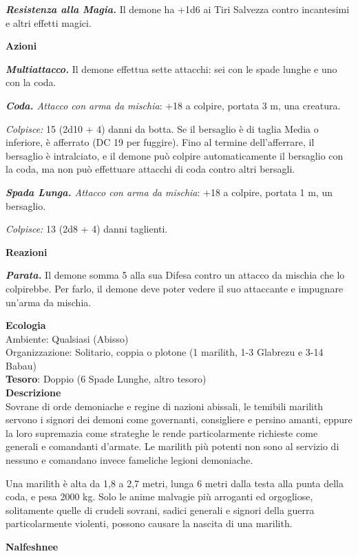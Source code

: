 \begin{multicols}{2}
\textit{\textbf{Resistenza alla Magia.}} Il demone ha +1d6 ai Tiri Salvezza contro incantesimi e altri effetti magici.

\textbf{Azioni}

\textit{\textbf{Multiattacco.}} Il demone effettua sette attacchi: sei con le spade lunghe e uno con la coda.

\textit{\textbf{Coda.} Attacco con arma da mischia}: +18 a colpire, portata 3 m, una creatura.

\textit{Colpisce:} 15 (2d10 + 4) danni da botta. Se il bersaglio è di taglia Media o inferiore, è afferrato (DC 19 per fuggire). Fino al termine dell'afferrare, il bersaglio è intralciato, e il demone può colpire automaticamente il bersaglio con la coda, ma non può effettuare attacchi di coda contro altri bersagli.

\textit{\textbf{Spada Lunga.} Attacco con arma da mischia}: +18 a colpire, portata 1 m, un bersaglio.

\textit{Colpisce:} 13 (2d8 + 4) danni taglienti.

\textbf{Reazioni}

\textit{\textbf{Parata.}} Il demone somma 5 alla sua Difesa contro un attacco da mischia che lo colpirebbe. Per farlo, il demone deve poter vedere il suo attaccante e impugnare un'arma da mischia.

\textbf{Ecologia}\\
Ambiente: Qualsiasi (Abisso)\\
Organizzazione: Solitario, coppia o plotone (1 marilith, 1-3 Glabrezu e 3-14 Babau)\\
\textbf{Tesoro}: Doppio (6 Spade Lunghe, altro tesoro)\\
\textbf{Descrizione}\\
Sovrane di orde demoniache e regine di nazioni abissali, le temibili marilith servono i signori dei demoni come governanti, consigliere e persino amanti, eppure la loro supremazia come strateghe le rende particolarmente richieste come generali e comandanti d'armate. Le marilith più potenti non sono al servizio di nessuno e comandano invece fameliche legioni demoniache.

Una marilith è alta da 1,8 a 2,7 metri, lunga 6 metri dalla testa alla punta della coda, e pesa 2000 kg. Solo le anime malvagie più arroganti ed orgogliose, solitamente quelle di crudeli sovrani, sadici generali e signori della guerra particolarmente violenti, possono causare la nascita di una marilith.

\medskip{}\textbf{Nalfeshnee}


\end{multicols}
